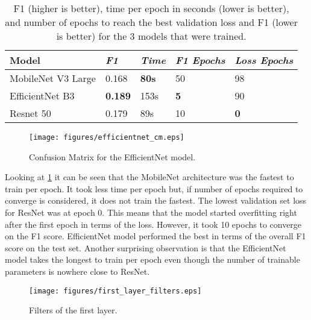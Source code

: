 \documentclass[conference]{IEEEtran}
\begin{document}
\begin{table}[htbp]
    \caption{F1 (higher is better), time per epoch in seconds (lower is better), and number of epochs to reach the best validation loss and F1 (lower is better) for the 3 models that were trained.}
    \centering
    \boldmath
    \begin{tabular}{p{2cm}|p{1cm}|p{1cm}|p{1.2cm}|p{1cm}}
    \hline
    Model & \emph{F1} & \emph{Time} & \emph{F1 Epochs} & \emph{Loss Epochs}\\
    \hline
    MobileNet V3 Large & 0.168 & \textbf{80s} & 50 & 98\\
    \hline
    EfficientNet B3 & \textbf{0.189} & 153s & \textbf{5} & 90\\
    \hline
    Resnet 50 & 0.179 & 89s & 10 & \textbf{0}\\
    \hline
    \end{tabular}
    \label{tab:test_metrics}
    \end{table}

    \begin{figure}[htbp]
      \centering
      \texttt{[image: figures/efficientnet\_cm.eps]}  
      \caption{Confusion Matrix for the EfficientNet model.}
      \label{fig:conf}
    \end{figure}
  

Looking at \ref{tab:test_metrics} it can be seen that the MobileNet architecture was 
the fastest to train per epoch. It took less time per epoch but, if number of epochs 
required to converge is considered, it does not train the fastest. The lowest validation
 set loss for ResNet was at epoch 0. This means that the model started overfitting right 
 after the first epoch in terms of the loss. However, it took 10 epochs to converge on the F1 score. 
 EfficientNet model performed the best in terms of the overall F1 score on the test set. Another 
 surprising observation is that the EfficientNet model takes the longest to train per epoch even 
 though the number of trainable parameters is nowhere close to ResNet. 

 \begin{figure}[htbp]
  \centering
  \texttt{[image: figures/first\_layer\_filters.eps]}  
  \caption{Filters of the first layer.}
  \label{fig:filters}
\end{figure}
\end{document}
